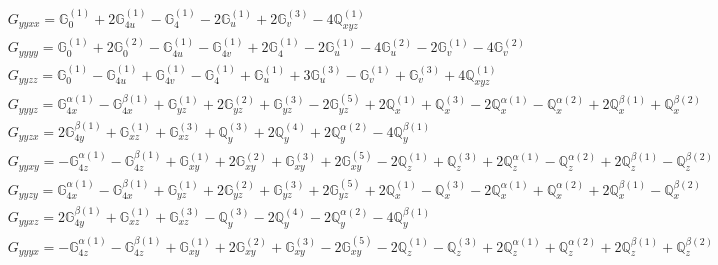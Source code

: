 \documentclass[fleqn,8pt,landscape]{jsarticle}
\begin{document}
\begin{align*}
& G_{yyxx} = \mathbb{G}_{0}^{(1)} + 2 \mathbb{G}_{4u}^{(1)} - \mathbb{G}_{4}^{(1)} - 2 \mathbb{G}_{u}^{(1)} + 2 \mathbb{G}_{v}^{(3)} - 4 \mathbb{Q}_{xyz}^{(1)} \\
& G_{yyyy} = \mathbb{G}_{0}^{(1)} + 2 \mathbb{G}_{0}^{(2)} - \mathbb{G}_{4u}^{(1)} - \mathbb{G}_{4v}^{(1)} + 2 \mathbb{G}_{4}^{(1)} - 2 \mathbb{G}_{u}^{(1)} - 4 \mathbb{G}_{u}^{(2)} - 2 \mathbb{G}_{v}^{(1)} - 4 \mathbb{G}_{v}^{(2)} \\
& G_{yyzz} = \mathbb{G}_{0}^{(1)} - \mathbb{G}_{4u}^{(1)} + \mathbb{G}_{4v}^{(1)} - \mathbb{G}_{4}^{(1)} + \mathbb{G}_{u}^{(1)} + 3 \mathbb{G}_{u}^{(3)} - \mathbb{G}_{v}^{(1)} + \mathbb{G}_{v}^{(3)} + 4 \mathbb{Q}_{xyz}^{(1)} \\
& G_{yyyz} = \mathbb{G}_{4x}^{\alpha(1)} - \mathbb{G}_{4x}^{\beta(1)} + \mathbb{G}_{yz}^{(1)} + 2 \mathbb{G}_{yz}^{(2)} + \mathbb{G}_{yz}^{(3)} - 2 \mathbb{G}_{yz}^{(5)} + 2 \mathbb{Q}_{x}^{(1)} + \mathbb{Q}_{x}^{(3)} - 2 \mathbb{Q}_{x}^{\alpha(1)} - \mathbb{Q}_{x}^{\alpha(2)} + 2 \mathbb{Q}_{x}^{\beta(1)} + \mathbb{Q}_{x}^{\beta(2)} \\
& G_{yyzx} = 2 \mathbb{G}_{4y}^{\beta(1)} + \mathbb{G}_{xz}^{(1)} + \mathbb{G}_{xz}^{(3)} + \mathbb{Q}_{y}^{(3)} + 2 \mathbb{Q}_{y}^{(4)} + 2 \mathbb{Q}_{y}^{\alpha(2)} - 4 \mathbb{Q}_{y}^{\beta(1)} \\
& G_{yyxy} = - \mathbb{G}_{4z}^{\alpha(1)} - \mathbb{G}_{4z}^{\beta(1)} + \mathbb{G}_{xy}^{(1)} + 2 \mathbb{G}_{xy}^{(2)} + \mathbb{G}_{xy}^{(3)} + 2 \mathbb{G}_{xy}^{(5)} - 2 \mathbb{Q}_{z}^{(1)} + \mathbb{Q}_{z}^{(3)} + 2 \mathbb{Q}_{z}^{\alpha(1)} - \mathbb{Q}_{z}^{\alpha(2)} + 2 \mathbb{Q}_{z}^{\beta(1)} - \mathbb{Q}_{z}^{\beta(2)} \\
& G_{yyzy} = \mathbb{G}_{4x}^{\alpha(1)} - \mathbb{G}_{4x}^{\beta(1)} + \mathbb{G}_{yz}^{(1)} + 2 \mathbb{G}_{yz}^{(2)} + \mathbb{G}_{yz}^{(3)} + 2 \mathbb{G}_{yz}^{(5)} + 2 \mathbb{Q}_{x}^{(1)} - \mathbb{Q}_{x}^{(3)} - 2 \mathbb{Q}_{x}^{\alpha(1)} + \mathbb{Q}_{x}^{\alpha(2)} + 2 \mathbb{Q}_{x}^{\beta(1)} - \mathbb{Q}_{x}^{\beta(2)} \\
& G_{yyxz} = 2 \mathbb{G}_{4y}^{\beta(1)} + \mathbb{G}_{xz}^{(1)} + \mathbb{G}_{xz}^{(3)} - \mathbb{Q}_{y}^{(3)} - 2 \mathbb{Q}_{y}^{(4)} - 2 \mathbb{Q}_{y}^{\alpha(2)} - 4 \mathbb{Q}_{y}^{\beta(1)} \\
& G_{yyyx} = - \mathbb{G}_{4z}^{\alpha(1)} - \mathbb{G}_{4z}^{\beta(1)} + \mathbb{G}_{xy}^{(1)} + 2 \mathbb{G}_{xy}^{(2)} + \mathbb{G}_{xy}^{(3)} - 2 \mathbb{G}_{xy}^{(5)} - 2 \mathbb{Q}_{z}^{(1)} - \mathbb{Q}_{z}^{(3)} + 2 \mathbb{Q}_{z}^{\alpha(1)} + \mathbb{Q}_{z}^{\alpha(2)} + 2 \mathbb{Q}_{z}^{\beta(1)} + \mathbb{Q}_{z}^{\beta(2)} \\

\end{align*}
\end{document}
